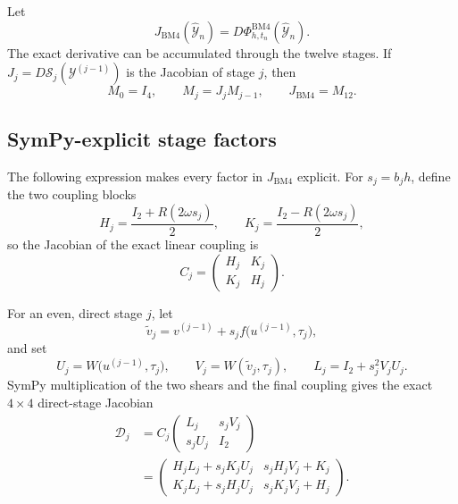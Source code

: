 \documentclass[11pt,a4paper]{article}
\newcommand{\Id}{I}
\newcommand{\Y}{\mathcal{Y}}
\newcommand{\PhiBM}{\Phi^{\mathrm{BM4}}_{h,t_n}}
\begin{document}
Let
\[
 J_{\mathrm{BM4}}(\widehat{\Y}_n)
 =D\PhiBM(\widehat{\Y}_n).
\]
The exact derivative can be accumulated through the twelve stages.  If
$J_j=D\mathcal S_j(\Y^{(j-1)})$ is the Jacobian of stage $j$, then
\[
 M_0=\Id_4,
 \qquad
 M_j=J_jM_{j-1},
 \qquad
 J_{\mathrm{BM4}}=M_{12}.
\]

\subsection*{SymPy-explicit stage factors}

The following expression makes every factor in $J_{\mathrm{BM4}}$ explicit.
For $s_j=b_jh$, define the two coupling blocks
\[
 H_j=\frac{\Id_2+R(2\omega s_j)}{2},
 \qquad
 K_j=\frac{\Id_2-R(2\omega s_j)}{2},
\]
so the Jacobian of the exact linear coupling is
\[
 C_j=
 \begin{pmatrix}
  H_j&K_j\\
  K_j&H_j
 \end{pmatrix}.
\]

For an even, direct stage $j$, let
\[
 \widetilde v_j
 =v^{(j-1)}+s_jf\bigl(u^{(j-1)},\tau_j\bigr),
\]
and set
\[
 U_j=W\bigl(u^{(j-1)},\tau_j\bigr),
 \qquad
 V_j=W(\widetilde v_j,\tau_j),
 \qquad
 L_j=\Id_2+s_j^2V_jU_j.
\]
SymPy multiplication of the two shears and the final coupling gives the exact
$4\times4$ direct-stage Jacobian
\[
 \boxed{
 \begin{aligned}
 \mathcal D_j
 &=C_j
 \begin{pmatrix}
  L_j&s_jV_j\\
  s_jU_j&\Id_2
 \end{pmatrix}\\[2mm]
 &=
 \begin{pmatrix}
  H_jL_j+s_jK_jU_j&s_jH_jV_j+K_j\\
  K_jL_j+s_jH_jU_j&s_jK_jV_j+H_j
 \end{pmatrix}.
 \end{aligned}
 }
\]
\end{document}
